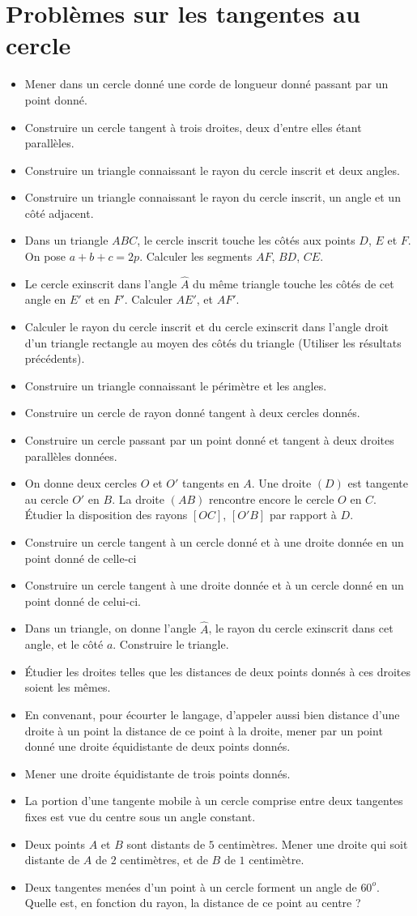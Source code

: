 \documentclass[12 pt]{report}
\theoremstyle{plain}
\newcounter{n}
\renewcommand{\it}{\item[$\mathbf{\then}.$]\stepcounter{n} }
\begin{document}
\chapter{Problèmes sur les tangentes au cercle} 
 \begin{itemize}
 \it Mener dans un cercle donné une corde de longueur donné passant
 par un point donné. 
 \it Construire un cercle tangent à trois droites, deux d'entre elles étant parallèles. 
 \it Construire un triangle connaissant le rayon du cercle inscrit et deux angles. 
 \it Construire un triangle connaissant le rayon du cercle inscrit, un angle et un côté adjacent. 
 \it Dans un triangle $ABC$, le cercle inscrit touche les côtés aux points $D$, $E$ et $F$. On pose $a+b+c=2p$. Calculer les segments $AF$, $BD$, $CE$. 
 \it Le cercle exinscrit dans l'angle $\widehat{A}$ du même triangle touche les côtés de cet angle en $E'$ et en $F'$. Calculer $AE'$, et $AF'$. 
 \it Calculer le rayon du cercle inscrit et du cercle exinscrit dans 
 l'angle droit d'un triangle rectangle au moyen des côtés du triangle (Utiliser les résultats précédents).
 \it Construire un triangle connaissant le périmètre et les angles. 
 \it Construire un cercle de rayon donné tangent à deux cercles donnés. 
 \it Construire un cercle passant par un point donné et tangent à deux
 droites parallèles données. 
 \it On donne deux cercles $O$ et $O'$ tangents en $A$. Une droite $(D)$ est tangente au cercle $O'$ en $B$. La droite $(AB)$ rencontre encore le cercle $O$ en $C$. Étudier la disposition des rayons $[OC]$, $[O'B]$ par rapport à $D$. 
 \it Construire un cercle tangent à un cercle donné et à une droite donnée en un point donné de celle-ci 
 \it Construire un cercle tangent à une droite donnée et à un cercle 
 donné en un point donné de celui-ci. 
 \it Dans un triangle, on donne l'angle $\widehat{A}$, le rayon du cercle exinscrit dans cet angle, et le côté $a$. Construire le triangle.
 \it Étudier les droites telles que les distances de deux points donnés à ces droites soient les mêmes. 
 \it En convenant, pour écourter le langage, d'appeler aussi bien distance d'une droite à un point la distance de ce point à la droite,
 mener par un point donné une droite équidistante de deux points donnés. 
 \it Mener une droite équidistante de trois points donnés. 
 \it La portion d'une tangente mobile à un cercle comprise entre deux tangentes fixes est vue du centre sous un angle constant. 
 \it Deux points $A$ et $B$ sont distants de $5$ centimètres. Mener une droite qui soit distante de $A$ de $2$ centimètres, et de $B$ de $1$ centimètre. 
 \it Deux tangentes menées d'un point à un cercle forment un angle de $60^o$. Quelle est, en fonction du rayon, la distance de ce point au centre ? 

\end{itemize}
\end{document}
